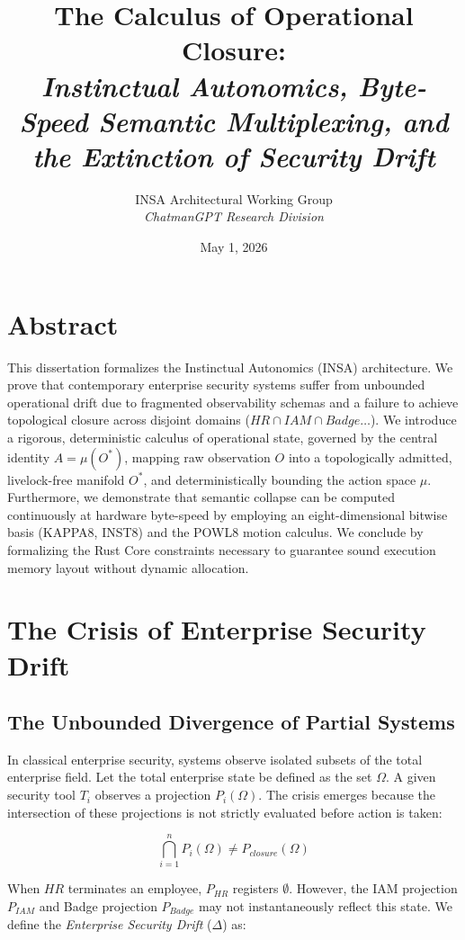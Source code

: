 \documentclass[11pt,twoside,a4paper]{book}
\title{\textbf{The Calculus of Operational Closure:} \\ \Large \textit{Instinctual Autonomics, Byte-Speed Semantic Multiplexing, and the Extinction of Security Drift}}
\author{INSA Architectural Working Group \\ \textit{ChatmanGPT Research Division}}
\date{May 1, 2026}
\begin{document}
\maketitle

\chapter*{Abstract}
This dissertation formalizes the Instinctual Autonomics (INSA) architecture. We prove that contemporary enterprise security systems suffer from unbounded operational drift due to fragmented observability schemas and a failure to achieve topological closure across disjoint domains ($HR \cap IAM \cap Badge \dots$). We introduce a rigorous, deterministic calculus of operational state, governed by the central identity $A = \mu(O^*)$, mapping raw observation $O$ into a topologically admitted, livelock-free manifold $O^*$, and deterministically bounding the action space $\mu$. Furthermore, we demonstrate that semantic collapse can be computed continuously at hardware byte-speed by employing an eight-dimensional bitwise basis (KAPPA8, INST8) and the POWL8 motion calculus. We conclude by formalizing the Rust Core constraints necessary to guarantee sound execution memory layout without dynamic allocation.

\tableofcontents

\chapter{The Crisis of Enterprise Security Drift}
\section{The Unbounded Divergence of Partial Systems}

In classical enterprise security, systems observe isolated subsets of the total enterprise field. Let the total enterprise state be defined as the set $\Omega$. A given security tool $T_i$ observes a projection $P_i(\Omega)$. The crisis emerges because the intersection of these projections is not strictly evaluated before action is taken:

\begin{equation}
\bigcap_{i=1}^{n} P_i(\Omega) \neq P_{closure}(\Omega)
\end{equation}

When $HR$ terminates an employee, $P_{HR}$ registers $\emptyset$. However, the IAM projection $P_{IAM}$ and Badge projection $P_{Badge}$ may not instantaneously reflect this state. We define the \textit{Enterprise Security Drift} ($\Delta$) as:
\end{document}
